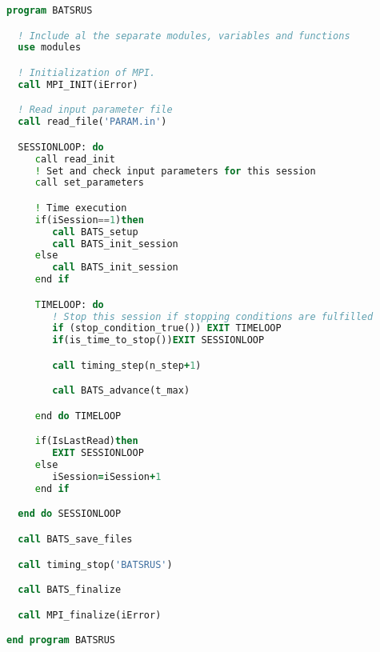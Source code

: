 \begin{lstlisting}[language=Fortran,caption=High level structure of BATS-R-US,frame=tlrb,breaklines=true,columns=fullflexible,label={list:code_structure}] 
program BATSRUS

  ! Include al the separate modules, variables and functions
  use modules

  ! Initialization of MPI.
  call MPI_INIT(iError)

  ! Read input parameter file
  call read_file('PARAM.in')

  SESSIONLOOP: do
     call read_init
     ! Set and check input parameters for this session
     call set_parameters

     ! Time execution
     if(iSession==1)then
        call BATS_setup
        call BATS_init_session
     else
        call BATS_init_session
     end if

     TIMELOOP: do
        ! Stop this session if stopping conditions are fulfilled
        if (stop_condition_true()) EXIT TIMELOOP
        if(is_time_to_stop())EXIT SESSIONLOOP

        call timing_step(n_step+1)

        call BATS_advance(t_max)

     end do TIMELOOP

     if(IsLastRead)then
        EXIT SESSIONLOOP
     else
        iSession=iSession+1
     end if

  end do SESSIONLOOP

  call BATS_save_files

  call timing_stop('BATSRUS')

  call BATS_finalize

  call MPI_finalize(iError)

end program BATSRUS

\end{lstlisting}